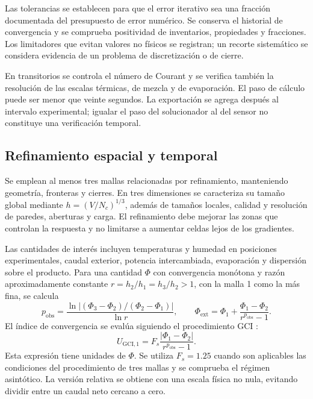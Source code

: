 Las tolerancias se establecen para que el error iterativo sea una fracción documentada del presupuesto de error numérico. Se conserva el historial de convergencia y se comprueba positividad de inventarios, propiedades y fracciones. Los limitadores que evitan valores no físicos se registran; un recorte sistemático se considera evidencia de un problema de discretización o de cierre.

En transitorios se controla el número de Courant y se verifica también la resolución de las escalas térmicas, de mezcla y de evaporación. El paso de cálculo puede ser menor que veinte segundos. La exportación se agrega después al intervalo experimental; igualar el paso del solucionador al del sensor no constituye una verificación temporal.

\subsection{Refinamiento espacial y temporal}
\label{met:refinamiento}

Se emplean al menos tres mallas relacionadas por refinamiento, manteniendo geometría, fronteras y cierres. En tres dimensiones se caracteriza su tamaño global mediante $h=(V/N_c)^{1/3}$, además de tamaños locales, calidad y resolución de paredes, aberturas y carga. El refinamiento debe mejorar las zonas que controlan la respuesta y no limitarse a aumentar celdas lejos de los gradientes.

Las cantidades de interés incluyen temperaturas y humedad en posiciones experimentales, caudal exterior, potencia intercambiada, evaporación y dispersión sobre el producto. Para una cantidad $\Phi$ con convergencia monótona y razón aproximadamente constante $r=h_2/h_1=h_3/h_2>1$, con la malla 1 como la más fina, se calcula
\begin{equation}
p_{\mathrm{obs}}=
\frac{\ln|(\Phi_3-\Phi_2)/(\Phi_2-\Phi_1)|}{\ln r},
\qquad
\Phi_{\mathrm{ext}}=\Phi_1+
\frac{\Phi_1-\Phi_2}{r^{p_{\mathrm{obs}}}-1}.
\label{met:richardson}
\end{equation}
El índice de convergencia se evalúa siguiendo el procedimiento GCI \cite{celik2008}:
\begin{equation}
U_{\mathrm{GCI},1}=
F_s\frac{|\Phi_1-\Phi_2|}{r^{p_{\mathrm{obs}}}-1}.
\label{met:gci}
\end{equation}
Esta expresión tiene unidades de $\Phi$. Se utiliza $F_s=1.25$ cuando son aplicables las condiciones del procedimiento de tres mallas y se comprueba el régimen asintótico. La versión relativa se obtiene con una escala física no nula, evitando dividir entre un caudal neto cercano a cero.

